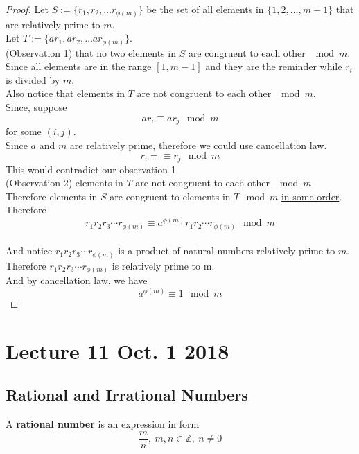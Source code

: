 \documentclass[11pt]{article}
\begin{document}
	\begin{proof}\renewcommand{\qedsymbol}{\textcolor{red}{$ \ensuremath\varheartsuit$}}
		Let $S := \{r_1, r_2, \dots r_{\phi(m)}\}$ be the set of all elements in $\{1, 2, \dots, m-1\}$ that are relatively prime to $m$. \\
		Let $T := \{a r_1, a r_2, \dots a r_{\phi(m)}\}$. \\
		(Observation 1) that no two elements in $S$ are congruent to each other $\mod m$. Since all elements are in the range $[1, m-1]$ and they are the reminder while $r_i$ is divided by $m$. \\
		Also notice that elements in $T$ are not congruent to each other $\mod m$.\\
		Since, suppose \[a r_i \equiv a r_j \mod m\] for some $(i, j)$. \\
		Since $a$ and $m$ are relatively prime, therefore we could use cancellation law.\\
		\[
			r_i =\equiv r_j \mod m
		\]
		This would contradict our observation 1 \\
		(Observation 2) elements in $T$ are not congruent to each other $\mod m$. \\
		Therefore elements in $S$ are congruent to elements in $T \mod m$ \ul{in some order}. \\
		Therefore \[ r_1 r_2 r_3 \cdots r_{\phi(m)} \equiv a^{\phi(m)} r_1 r_2 \cdots r_{\phi(m)} \mod m \]\\
		 And notice $r_1 r_2 r_3 \cdots r_{\phi(m)}$ is a product of natural numbers relatively prime to $m$. \\
		 Therefore $r_1 r_2 r_3 \cdots r_{\phi(m)}$ is relatively prime to m. \\
		 And by cancellation law, we have 
		 \[
		 	a^{\phi(m)} \equiv 1 \mod m
		 \]
	\end{proof}
	
	\section{Lecture 11 Oct. 1 2018}
	\subsection{Rational and Irrational Numbers}
	\begin{definition}
		A \textbf{rational number} is an expression in form 
		\[
			\frac{m}{n},\ m,n \in \mathbb{Z},\ n \neq 0
		\]
	\end{definition}
	
\end{document}
